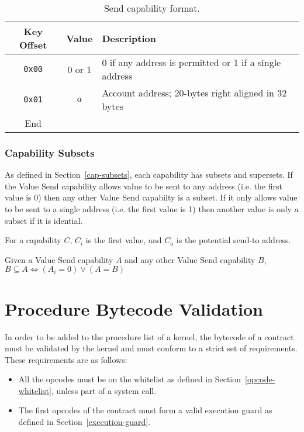 \documentclass[english,a4paper]{article}
\let\oldparagraph\subsubsection
\renewcommand{\subsubsection}[1]{\oldparagraph{#1}\mbox{}}
\begin{document}
\begin{table}[H]
  \caption{Send capability format.}
  \centering{}%
  \begin{tabularx}{\textwidth}{c|c|X}
    \hline
    Key Offset & Value & Description\\
    \hline
    \hline
    \texttt{0x00} & 0 or 1 & 0 if any address is permitted or 1 if a single address \\
    \texttt{0x01} & $a$ & Account address; 20-bytes right aligned in 32 bytes \\
    \hline
    End &  \\
    \hline
  \end{tabularx}
\end{table}

\subsubsection{Capability Subsets}
As defined in Section~\ref{cap-subsets}, each capability has subsets and
supersets. If the Value Send capability allows value to be sent to any address
(i.e. the first value is 0) then any other Value Send capabilty is a subset. If
it only allows value to be sent to a single address (i.e. the first value is 1)
then another value is only a subset if it is idential.

For a capability $C$, $C_i$ is the first value, and $C_a$ is the potential
send-to address.

Given a Value Send capability $A$ and any other Value Send capability $B$, $B
\subseteq A \iff \left(A_i = 0\right) \lor \left(A = B\right)$

\section{Procedure Bytecode Validation}\label{bytecode-validation}
In order to be added to the procedure list of a kernel, the bytecode of a contract must be validated by the kernel and must conform to a strict set of requirements. These requirements are as follows:

\begin{itemize}
  \item All the opcodes must be on the whitelist as defined in Section~\ref{opcode-whitelist}, unless part
  of a system call.
  \item The first opcodes of the contract must form a valid execution guard as
  defined in Section~\ref{execution-guard}.
\end{itemize}
\end{document}
